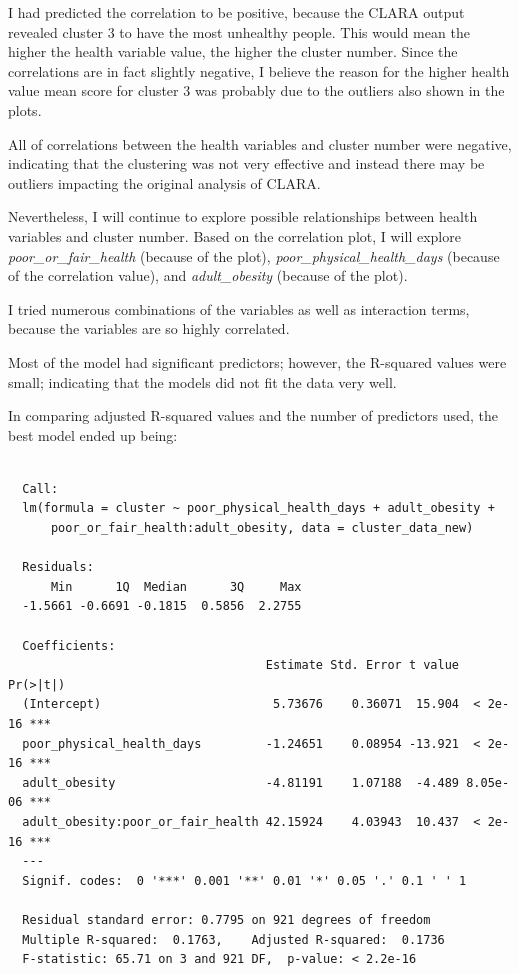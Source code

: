 \documentclass[12pt,twoside]{amherstthesis}
\begin{document}
  I had predicted the correlation to be positive, because the CLARA output
  revealed cluster 3 to have the most unhealthy people. This would mean
  the higher the health variable value, the higher the cluster number.
  Since the correlations are in fact slightly negative, I believe the
  reason for the higher health value mean score for cluster 3 was probably
  due to the outliers also shown in the plots.
  
  All of correlations between the health variables and cluster number were
  negative, indicating that the clustering was not very effective and
  instead there may be outliers impacting the original analysis of CLARA.
  
  Nevertheless, I will continue to explore possible relationships between
  health variables and cluster number. Based on the correlation plot, I
  will explore \emph{poor\_or\_fair\_health} (because of the plot),
  \emph{poor\_physical\_health\_days} (because of the correlation value),
  and \emph{adult\_obesity} (because of the plot).
  
  I tried numerous combinations of the variables as well as interaction
  terms, because the variables are so highly correlated.
  
  Most of the model had significant predictors; however, the R-squared
  values were small; indicating that the models did not fit the data very
  well.
  
  In comparing adjusted R-squared values and the number of predictors
  used, the best model ended up being:
  
  \begin{Shaded}
  \begin{Highlighting}[]
  \end{Highlighting}
  \end{Shaded}
  
  \begin{verbatim}
  
  Call:
  lm(formula = cluster ~ poor_physical_health_days + adult_obesity + 
      poor_or_fair_health:adult_obesity, data = cluster_data_new)
  
  Residuals:
      Min      1Q  Median      3Q     Max 
  -1.5661 -0.6691 -0.1815  0.5856  2.2755 
  
  Coefficients:
                                    Estimate Std. Error t value Pr(>|t|)    
  (Intercept)                        5.73676    0.36071  15.904  < 2e-16 ***
  poor_physical_health_days         -1.24651    0.08954 -13.921  < 2e-16 ***
  adult_obesity                     -4.81191    1.07188  -4.489 8.05e-06 ***
  adult_obesity:poor_or_fair_health 42.15924    4.03943  10.437  < 2e-16 ***
  ---
  Signif. codes:  0 '***' 0.001 '**' 0.01 '*' 0.05 '.' 0.1 ' ' 1
  
  Residual standard error: 0.7795 on 921 degrees of freedom
  Multiple R-squared:  0.1763,    Adjusted R-squared:  0.1736 
  F-statistic: 65.71 on 3 and 921 DF,  p-value: < 2.2e-16
  \end{verbatim}
  
\end{document}
